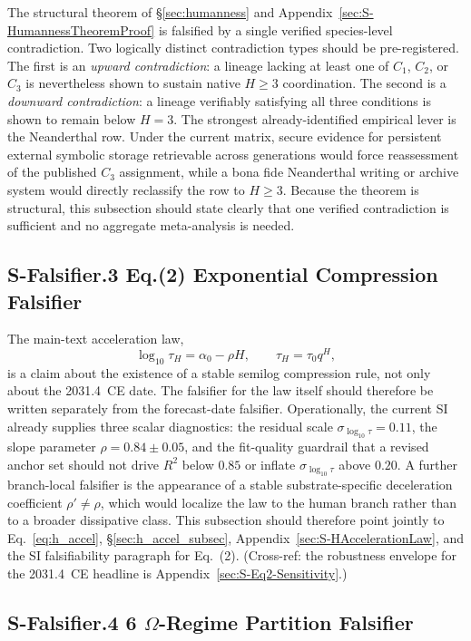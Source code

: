 \documentclass[11pt]{article}
\begin{document}
The structural theorem of \S\ref{sec:humanness} and
Appendix~\ref{sec:S-HumannessTheoremProof} is falsified by a single verified
species-level contradiction. Two logically distinct contradiction types should
be pre-registered. The first is an \emph{upward contradiction}: a lineage
lacking at least one of $C_1$, $C_2$, or $C_3$ is nevertheless shown to
sustain native $H\ge 3$ coordination. The second is a \emph{downward
contradiction}: a lineage verifiably satisfying all three conditions is shown
to remain below $H=3$. The strongest already-identified empirical lever is
the Neanderthal row. Under the current matrix, secure evidence for persistent
external symbolic storage retrievable across generations would force
reassessment of the published $C_3$ assignment, while a bona fide Neanderthal
writing or archive system would directly reclassify the row to $H\ge 3$.
Because the theorem is structural, this subsection should state clearly that
one verified contradiction is sufficient and no aggregate meta-analysis is
needed.

\subsection*{S-Falsifier.3 Eq.(2) Exponential Compression Falsifier}
\label{sec:S-Falsifier-eq2}

The main-text acceleration law,
\[\log_{10}\tau_H=\alpha_0-\rho H,\qquad\tau_H=\tau_0 q^H,\]
is a claim about the existence of a stable semilog compression rule, not only
about the 2031.4~CE date. The falsifier for the law itself should therefore
be written separately from the forecast-date falsifier. Operationally, the
current SI already supplies three scalar diagnostics: the residual scale
$\sigma_{\log_{10}\tau}=0.11$, the slope parameter $\rho=0.84\pm 0.05$, and
the fit-quality guardrail that a revised anchor set should not drive $R^2$
below $0.85$ or inflate $\sigma_{\log_{10}\tau}$ above $0.20$. A further
branch-local falsifier is the appearance of a stable substrate-specific
deceleration coefficient $\rho'\neq\rho$, which would localize the law to the
human branch rather than to a broader dissipative class. This subsection
should therefore point jointly to Eq.~\eqref{eq:h_accel},
\S\ref{sec:h_accel_subsec}, Appendix~\ref{sec:S-HAccelerationLaw}, and the SI
falsifiability paragraph for Eq.~(2). (Cross-ref: the robustness envelope for
the 2031.4~CE headline is Appendix~\ref{sec:S-Eq2-Sensitivity}.)

\subsection*{S-Falsifier.4 6 \texorpdfstring{$\Omega$}{Omega}-Regime Partition Falsifier}
\label{sec:S-Falsifier-omega}
\end{document}
